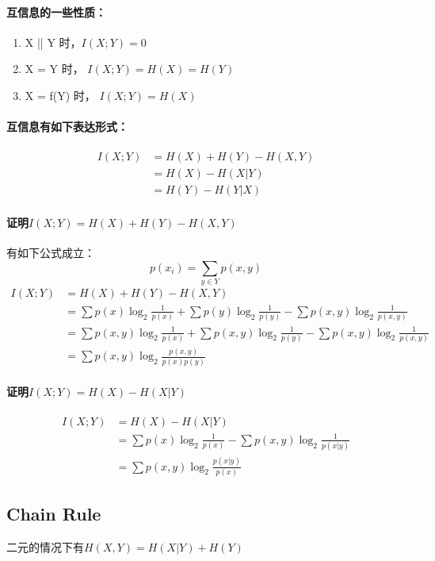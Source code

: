 \documentclass[a4paper, 12pt]{article}
\begin{document}
    \paragraph{互信息的一些性质：}
    \begin{enumerate}
        \item X || Y 时，$I(X;Y)=0$
        \item X = Y 时， $I(X;Y)=H(X)=H(Y)$
        \item X = f(Y) 时， $I(X;Y)=H(X)$
    \end{enumerate}
    \paragraph{互信息有如下表达形式：}
    \begin{align}
        I(X;Y)&=H(X)+H(Y)-H(X,Y)\\
        &=H(X)-H(X|Y)\\
        &=H(Y)-H(Y|X)
    \end{align}
    \paragraph{证明$I(X;Y)=H(X)+H(Y)-H(X,Y)$\\}
    有如下公式成立：
    \[p(x_i)=\sum_{y\in Y}p(x,y)\]
    \begin{align}
        I(X;Y)&=H(X)+H(Y)-H(X,Y)\\
        &=\sum p(x)\log_2\frac{1}{p(x)}+\sum p(y)\log_2\frac{1}{p(y)}-\sum p(x,y)\log_2\frac{1}{p(x,y)}\\
        &=\sum p(x,y)\log_2\frac{1}{p(x)}+\sum p(x,y)\log_2\frac{1}{p(y)}-\sum p(x,y)\log_2\frac{1}{p(x,y)}\\
        &=\sum p(x,y)\log_2\frac{p(x,y)}{p(x)p(y)}
    \end{align}
    \paragraph{证明$I(X;Y)=H(X)-H(X|Y)$\\}
    \begin{align}
        I(X;Y)&=H(X)-H(X|Y)\\
        &=\sum p(x)\log_2\frac{1}{p(x)}-\sum p(x,y)\log_2\frac{1}{p(x|y)}\\
        &=\sum p(x,y)\log_2\frac{p(x|y)}{p(x)}
    \end{align}
    \subsection{Chain Rule}
    二元的情况下有$H(X,Y)=H(X|Y)+H(Y)$\\
\end{document}
